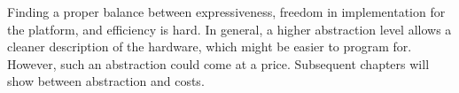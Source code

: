 Finding a proper balance between expressiveness, freedom in implementation for the platform, and efficiency is hard.
In general, a higher abstraction level allows a cleaner description of the hardware, which might be easier to program for.
However, such an abstraction could come at a price.
Subsequent chapters will show  between abstraction and costs.





